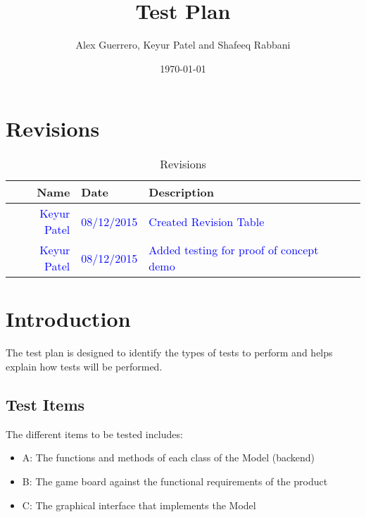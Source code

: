 \documentclass[12pt]{article}
\begin{document}
\title{Test Plan} 
\author{Alex Guerrero, Keyur Patel and Shafeeq Rabbani}
\date{\today}

\maketitle
\newpage

\section*{Revisions}
\begin{center}
	\begin{longtable}{ | r | p{4cm} | p{10cm} | p{4cm} |}
	\caption{Revisions} \\ \hline \label{TblInputVar} 
	Name & Date & Description\\ \hline
	\textcolor{blue}{Keyur Patel} & \textcolor{blue}{08/12/2015} &  \textcolor{blue}{Created Revision Table}\\ \hline
	\textcolor{blue}{Keyur Patel} & \textcolor{blue}{08/12/2015} &  \textcolor{blue}{Added testing for proof of concept demo}\\ \hline
	\end{longtable}
\end{center}

\newpage

\tableofcontents
\newpage
%
%

\section{Introduction}
The test plan is designed to identify the types of tests to perform and helps explain how tests will be performed.

\subsection{Test Items}
The different items to be tested includes:

\begin{itemize}
\item A: The functions and methods of each class of the Model (backend)
\item B: The game board against the functional requirements of the product
\item C: The graphical interface that implements the Model 
\end{itemize}
\end{document}
